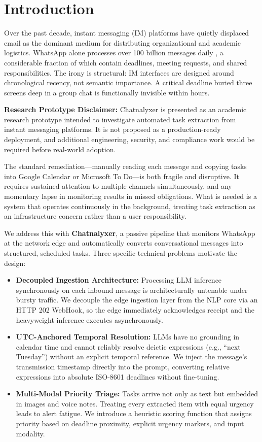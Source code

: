 \section{Introduction}
\label{sec:introduction}

Over the past decade, instant messaging (IM) platforms have quietly displaced email as the dominant medium for distributing organizational and academic logistics. WhatsApp alone processes over 100 billion messages daily \cite{meta2020whatsapp}, a considerable fraction of which contain deadlines, meeting requests, and shared responsibilities. The irony is structural: IM interfaces are designed around chronological recency, not semantic importance. A critical deadline buried three screens deep in a group chat is functionally invisible within hours.

\textbf{Research Prototype Disclaimer:} Chatnalyxer is presented as an academic research prototype intended to investigate automated task extraction from instant messaging platforms. It is not proposed as a production-ready deployment, and additional engineering, security, and compliance work would be required before real-world adoption.

The standard remediation—manually reading each message and copying tasks into Google Calendar or Microsoft To Do—is both fragile and disruptive. It requires sustained attention to multiple channels simultaneously, and any momentary lapse in monitoring results in missed obligations. What is needed is a system that operates continuously in the background, treating task extraction as an infrastructure concern rather than a user responsibility.

We address this with \textbf{Chatnalyxer}, a passive pipeline that monitors WhatsApp at the network edge and automatically converts conversational messages into structured, scheduled tasks. Three specific technical problems motivate the design:

\begin{itemize}
    \item \textbf{Decoupled Ingestion Architecture:} Processing LLM inference synchronously on each inbound message is architecturally untenable under bursty traffic. We decouple the edge ingestion layer from the NLP core via an HTTP 202 WebHook, so the edge immediately acknowledges receipt and the heavyweight inference executes asynchronously.
    \item \textbf{UTC-Anchored Temporal Resolution:} LLMs have no grounding in calendar time and cannot reliably resolve deictic expressions (e.g., ``next Tuesday'') without an explicit temporal reference. We inject the message's transmission timestamp directly into the prompt, converting relative expressions into absolute ISO-8601 deadlines without fine-tuning.
    \item \textbf{Multi-Modal Priority Triage:} Tasks arrive not only as text but embedded in images and voice notes. Treating every extracted item with equal urgency leads to alert fatigue. We introduce a heuristic scoring function that assigns priority based on deadline proximity, explicit urgency markers, and input modality.
\end{itemize}

